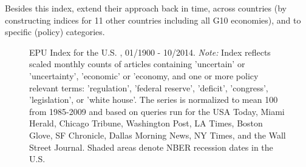\documentclass[a4paper,11pt,listof=nochaptergap,oneside,pointednumbers,bibtotoc,bigheadings,liststotoc]{scrbook}
\theoremstyle{mysatz}
\theoremstyle{mydefinition}
\theoremstyle{mybemerkung}
\begin{document}
Besides this index, \citet{bakeretal:15} extend their approach back in time, across countries (by constructing indices for 11 other countries including all G10 economies), and to specific (policy) categories.
 
 \begin{figure}[h]
   \centering
   \setlength\fboxsep{0pt}
   \setlength\fboxrule{0pt}
      \caption[Historical EPU Index for the U.S., 01/1900 - 10/2014.]{EPU Index for the U.S. , 01/1900 - 10/2014.
      \textit{Note:} Index reflects scaled monthly counts of articles containing 'uncertain' or 'uncertainty', 'economic' or 'economy, and one or more policy relevant terms: 'regulation', 'federal reserve', 'deficit', 'congress', 'legislation', or 'white house'. The series is normalized to mean 100 from 1985-2009 and based on queries run for the USA Today, Miami Herald, Chicago Tribune, Washington Post, LA Times, Boston Glove, SF Chronicle, Dallas Morning News, NY Times, and the Wall Street Journal. Shaded areas denote NBER recession dates in the U.S.}   \label{fig:epuindex_historical}
\end{figure}
 
\end{document}
